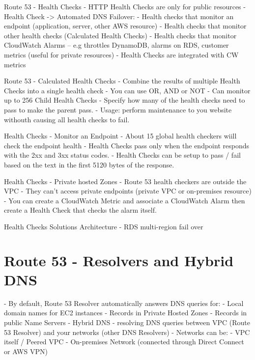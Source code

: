 \documentclass[11pt]{book}
\begin{document}
    Route 53 - Health Checks
    - HTTP Health Checks are only for public resources
    - Health Check -> Automated DNS Failover:
        - Health checks that monitor an endpoint (application, server, other AWS resource)
        - Health checks that monitor other health checks (Calculated Health Checks)
        - Health checks that monitor CloudWatch Alarms -- e.g throttles DynamoDB, alarms on RDS, customer metrics (useful for private resources)
    - Health Checks are integrated with CW metrics

    Route 53 - Calculated Health Checks
    - Combine the results of multiple Health Checks into a single health check
    - You can use OR, AND or NOT
    - Can monitor up to 256 Child Health Checks
    - Specify how many of the health checks need to pass to make the parent pass.
    - Usage: perform maintenance to you website withouth causing all health checks to fail.

    Health Checks - Monitor an Endpoint
    - About 15 global health checkers wiill check the endpoint health
    - Health Checks pass only when the endpoint responds with the 2xx and 3xx status codes.
    - Health Checks can be setup to pass / fail based on the text in the first 5120 bytes of the response.

    Health Checks - Private hosted Zones
    - Route 53 health checkers are outside the VPC
    - They can't access private endpoints (private VPC or on-premises resource)
    - You can create a CloudWatch Metric and associate a CloudWatch Alarm then create a Health Check that checks the alarm itself.

    Health Checks Solutions Architecture - RDS multi-region fail over

    \section{Route 53 - Resolvers and Hybrid DNS}
    - By default, Route 53 Resolver automatically answers DNS queries for:
        - Local domain names for EC2 instances
        - Records in Private Hosted Zones
        - Records in public Name Servers
    - Hybrid DNS - resolving DNS queries between VPC (Route 53 Resolver) and your networks (other DNS Resolvers)
    - Networks can be:
        - VPC itself / Peered VPC
        - On-premises Network (connected through Direct Connect or AWS VPN)
\end{document}

